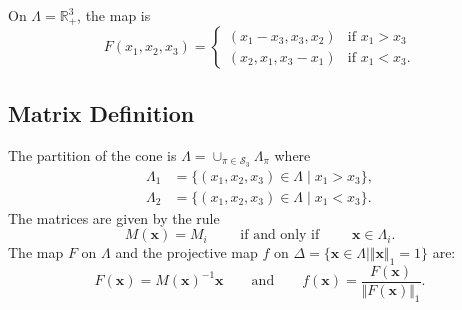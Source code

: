 On $\Lambda=\mathbb{R}^3_+$, the map is
\cite{cassaigne_algorithme_2015}
\[
F (x_1,x_2,x_3) = 
\begin{cases}
    (x_1-x_3, x_3, x_2) & \mbox{if } x_1 > x_3\\
    (x_2, x_1, x_3-x_1) & \mbox{if } x_1 < x_3.
\end{cases}
\]
\subsection{Matrix Definition}
The partition of the cone is
$\Lambda=\cup_{\pi\in\mathcal{S}_3}\Lambda_\pi$ where
\begin{align*}
	\Lambda_1 &= \{(x_1,x_2,x_3)\in\Lambda\mid 
	x_1 > x_3\}, \\
    \Lambda_2 &= \{(x_1,x_2,x_3)\in\Lambda\mid 
	x_1 < x_3\}.
\end{align*}
The matrices are given by the rule
\[
    M(\mathbf{x}) = M_i
    \qquad\text{ if and only if }\qquad
    \mathbf{x}\in\Lambda_i.
\]
The map $F$ on $\Lambda$ and
the projective map $f$ on
$\Delta=\{\mathbf{x}\in\Lambda\mid\Vert\mathbf{x}\Vert_1=1\}$ are:
\[
    F(\mathbf{x}) = M(\mathbf{x})^{-1}\mathbf{x}
    \qquad\text{and}\qquad
    f(\mathbf{x}) = \frac{F(\mathbf{x})}{\Vert F(\mathbf{x})\Vert_1}.
\]
